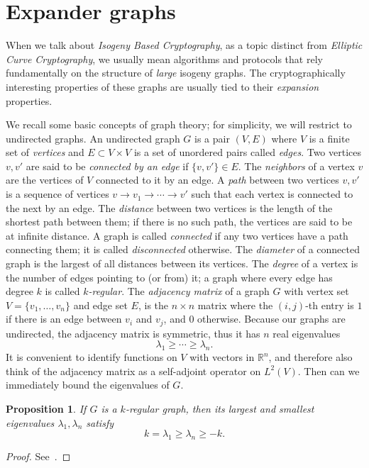 \documentclass[10pt]{article}
\theoremstyle{plain}
\newtheorem{proposition}[theorem]{Proposition}
\theoremstyle{definition}
\begin{document}
\section{Expander graphs}

When we talk about \emph{Isogeny Based Cryptography}, as a topic
distinct from \emph{Elliptic Curve Cryptography}, we usually mean
algorithms and protocols that rely fundamentally on the structure of
\emph{large} isogeny graphs. %
The cryptographically interesting properties of these graphs are
usually tied to their \emph{expansion} properties. %

We recall some basic concepts of graph theory; for simplicity, we will
restrict to undirected graphs. %
An undirected graph $G$ is a pair $(V,E)$ where $V$ is a finite set of
\emph{vertices} and $E⊂V×V$ is a set of unordered pairs called
\emph{edges}. %
Two vertices $v,v'$ are said to be \emph{connected by an edge} if
$\{v,v'\}∈E$. %
The \emph{neighbors} of a vertex $v$ are the vertices of $V$ connected
to it by an edge. %
A \emph{path} between two vertices $v,v'$ is a sequence of vertices
$v\to v_1\to\cdots\to v'$ such that each vertex is connected to the
next by an edge. %
The \emph{distance} between two vertices is the length of the shortest
path between them; if there is no such path, the vertices are said to
be at infinite distance. %
A graph is called \emph{connected} if any two vertices have a path
connecting them; it is called \emph{disconnected} otherwise. %
The \emph{diameter} of a connected graph is the largest of all
distances between its vertices. %
The \emph{degree} of a vertex is the number of edges pointing to (or
from) it; a graph where every edge has degree $k$ is called
\emph{$k$-regular}. %
The \emph{adjacency matrix} of a graph $G$ with vertex set
$V=\{v_1,\dots,v_n\}$ and edge set $E$, is the $n×n$ matrix where the
$(i,j)$-th entry is $1$ if there is an edge between $v_i$ and $v_j$,
and $0$ otherwise. %
Because our graphs are undirected, the adjacency matrix is symmetric,
thus it has $n$ real eigenvalues
\[λ_1≥\cdots≥λ_n.\] %
It is convenient to identify functions on $V$ with vectors in $ℝ^n$,
and therefore also think of the adjacency matrix as a self-adjoint
operator on $L^2(V)$. %
Then can we immediately bound the eigenvalues of $G$.

\begin{proposition}
  \label{th:graph-eigen}
  If $G$ is a $k$-regular graph, then its largest and smallest
  eigenvalues $λ_1,λ_n$ satisfy
  \[k=λ_1≥λ_n≥-k.\]
\end{proposition}
\begin{proof}
  See~\cite[Lem.~2]{tao2011expander}.
\end{proof}
\end{document}
